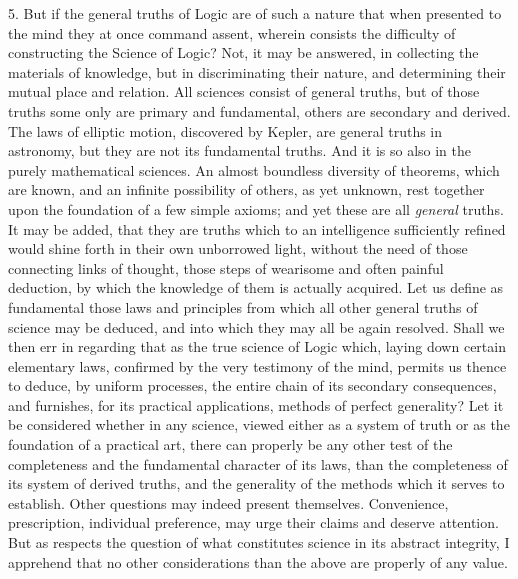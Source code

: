 \documentclass[oneside]{book}
\begin{document}
5. But if the general truths of Logic are of such a nature that
when presented to the mind they at once command assent,
wherein consists the difficulty of constructing the Science of
Logic? Not, it may be answered, in collecting the materials of
knowledge, but in discriminating their nature, and determining
their mutual place and relation. All sciences consist of general
truths, but of those truths some only are primary and fundamental,
others are secondary and derived. The laws of elliptic motion,
discovered by Kepler, are general truths in astronomy, but
they are not its fundamental truths. And it is so also in the
purely mathematical sciences. An almost boundless diversity of
theorems, which are known, and an infinite possibility of others,
as yet unknown, rest together upon the foundation of a few simple
axioms; and yet these are all \textit{general} truths. It may be
added, that they are truths which to an intelligence sufficiently
refined would shine forth in their own unborrowed light, without
the need of those connecting links of thought, those steps
of wearisome and often painful deduction, by which the knowledge
of them is actually acquired. Let us define as fundamental
those laws and principles from which all other general truths of
science may be deduced, and into which they may all be again
resolved. Shall we then err in regarding that as the true science
of Logic which, laying down certain elementary laws, confirmed
by the very testimony of the mind, permits us thence to deduce,
by uniform processes, the entire chain of its secondary consequences,
and furnishes, for its practical applications, methods of
perfect generality? Let it be considered whether in any science,
viewed either as a system of truth or as the foundation of a practical
art, there can properly be any other test of the completeness
and the fundamental character of its laws, than the completeness
of its system of derived truths, and the generality of the methods
which it serves to establish. Other questions may indeed present
themselves. Convenience, prescription, individual preference,
may urge their claims and deserve attention. But as
respects the question of what constitutes science in its abstract
integrity, I apprehend that no other considerations than the
above are properly of any value.
\end{document}
